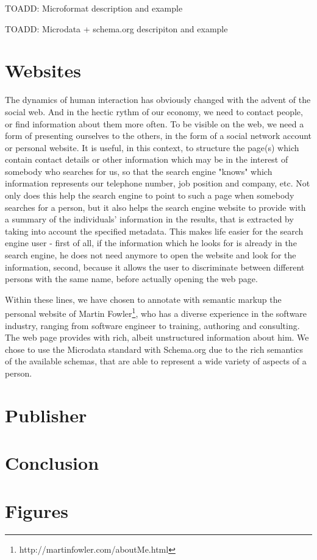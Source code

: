 \documentclass{acm_proc_10ptArticle-sp}
\begin{document}
TOADD: Microformat description and example

TOADD: Microdata + schema.org descripiton and example

\section{Websites}

The dynamics of human interaction has obviously changed with the advent of the social web. And in the hectic rythm of our economy, we need to contact people, or find information about them more often. To be visible on the web, we need a form of presenting ourselves to the others, in the form of a social network account or personal website. It is useful, in this context, to structure the page(s) which contain contact details or other information which may be in the interest of somebody who searches for us, so that the search engine "knows" which information represents our telephone number, job position and company, etc. Not only does this help the search engine to point to such a page when somebody searches for a person, but it also helps the search engine website to provide with a summary of the individuals' information in the results, that is extracted by taking into account the specified metadata. This makes life easier for the search engine user - first of all, if the information which he looks for is already in the search engine, he does not need anymore to open the website and look for the information, second, because it allows the user to discriminate between different persons with the same name, before actually opening the web page. 

Within these lines, we have chosen to annotate with semantic markup the personal website of Martin Fowler\footnote{http://martinfowler.com/aboutMe.html}, who has a diverse experience in the software industry, ranging from software engineer to training, authoring and consulting.  The web page provides with rich, albeit unstructured information about him. We chose to use the Microdata standard with Schema.org due to the rich semantics of the available schemas, that are able to represent a wide variety of aspects of a person. 


\section{Publisher}

\section{Conclusion}





\appendix
\section{Figures}
\end{document}
